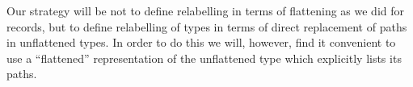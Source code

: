 Our strategy will be not
to define relabelling in terms of flattening as we did for records,
but to define relabelling of types in terms of direct replacement of
paths in unflattened types.  In order to do this we will, however,
find it convenient to use a ``flattened'' representation of the
unflattened type which explicitly lists its paths. 


